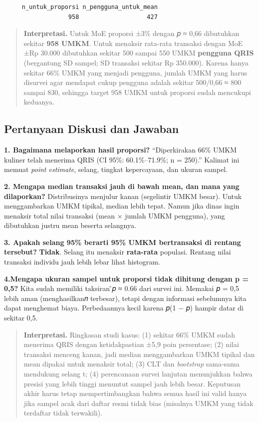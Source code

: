 \documentclass[
  indonesian,
  letterpaper,
]{book}
\begin{document}
\begin{verbatim}
     n_untuk_proporsi n_pengguna_untuk_mean 
                  958                   427 
\end{verbatim}

\begin{quote}
\textbf{Interpretasi.} Untuk MoE proporsi ±3\% dengan 𝑝 ≈ 0,66
dibutuhkan sekitar \textbf{958 UMKM}. Untuk menaksir rata-rata transaksi
dengan MoE ±Rp 30.000 dibutuhkan sekitar 500 sampai 550 UMKM
\textbf{pengguna QRIS} (bergantung SD sampel; SD transaksi sekitar Rp
350.000). Karena hanya sekitar 66\% UMKM yang menjadi pengguna, jumlah
UMKM yang harus disurvei agar mendapat cukup pengguna adalah sekitar
500/0,66 ≈ 800 sampai 830, sehingga target 958 UMKM untuk proporsi sudah
mencukupi keduanya.
\end{quote}

\subsection{Pertanyaan Diskusi dan
Jawaban}\label{pertanyaan-diskusi-dan-jawaban}

\textbf{1. Bagaimana melaporkan hasil proporsi?} ``Diperkirakan 66\%
UMKM kuliner telah menerima QRIS (CI 95\%: 60.1\%--71.9\%; n = 250).''
Kalimat ini memuat \emph{point estimate}, selang, tingkat kepercayaan,
dan ukuran sampel.

\textbf{2. Mengapa median transaksi jauh di bawah mean, dan mana yang
dilaporkan?} Distribusinya menjulur kanan (segelintir UMKM besar). Untuk
menggambarkan UMKM tipikal, median lebih tepat. Namun jika dinas ingin
menaksir total nilai transaksi (mean × jumlah UMKM pengguna), yang
dibutuhkan justru mean beserta selangnya.

\textbf{3. Apakah selang 95\% berarti 95\% UMKM bertransaksi di rentang
tersebut?} \textbf{Tidak}. Selang itu menaksir \textbf{rata-rata}
populasi. Rentang nilai transaksi individu jauh lebih lebar lihat
histogram.

\textbf{4.Mengapa ukuran sampel untuk proporsi tidak dihitung dengan p =
0,5?} Kita sudah memiliki taksiran ̂𝑝 ≈ 0.66 dari survei ini. Memakai 𝑝
= 0,5 lebih aman (menghasilkan𝑛 terbesar), tetapi dengan informasi
sebelumnya kita dapat menghemat biaya. Perbedaannya kecil karena 𝑝(1 −
𝑝) hampir datar di sekitar 0,5.

\begin{quote}
\textbf{Interpretasi.} Ringkasan studi kasus: (1) sekitar 66\% UMKM
sudah menerima QRIS dengan ketidakpastian ±5,9 poin persentase; (2)
nilai transaksi menceng kanan, jadi median menggambarkan UMKM tipikal
dan mean dipakai untuk menaksir total; (3) CLT dan \emph{bootstrap}
sama-sama mendukung selang t; (4) perencanaan survei lanjutan
menunjukkan bahwa presisi yang lebih tinggi menuntut sampel jauh lebih
besar. Keputusan akhir harus tetap mempertimbangkan bahwa semua hasil
ini valid hanya jika sampel acak dari daftar resmi tidak bias (misalnya
UMKM yang tidak terdaftar tidak terwakili).
\end{quote}
\end{document}
